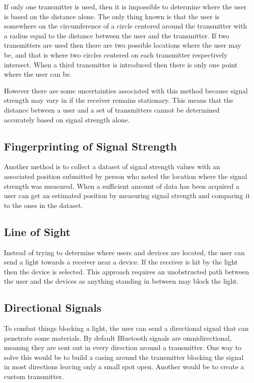If only one transmitter is used, then it is impossible to determine where the user is based on the distance alone. The only thing known is that the user is somewhere on the circumference of a circle centered around the transmitter with a radius equal to the distance between the user and the transmitter.
If two transmitters are used then there are two possible locations where the user may be, and that is where two circles centered on each transmitter respectively intersect.
When a third transmitter is introduced then there is only one point where the user can be.

However there are some uncertainties associated with this method because signal strength may vary in if the receiver remains stationary. This means that the distance between a user and a set of transmitters cannot be determined accurately based on signal strength alone.

\subsection*{Fingerprinting of Signal Strength}
Another method is to collect a dataset of signal strength values with an associated position submitted by person who noted the location where the signal strength was measured. When a sufficient amount of data has been acquired a user can get an estimated position by measuring signal strength and comparing it to the ones in the dataset.

\subsection*{Line of Sight}
Instead of trying to determine where users and devices are located, the user can send a light towards a receiver near a device. If the receiver is hit by the light then the device is selected. This approach requires an unobstructed path between the user and the devices as anything standing in between may block the light.

\subsection*{Directional Signals}
To combat things blocking a light, the user can send a directional signal that can penetrate some materials. By default Bluetooth signals are omnidirectional, meaning they are sent out in every direction around a transmitter. One way to solve this would be to build a casing around the transmitter blocking the signal in most directions leaving only a small spot open. Another would be to create a custom transmitter.

